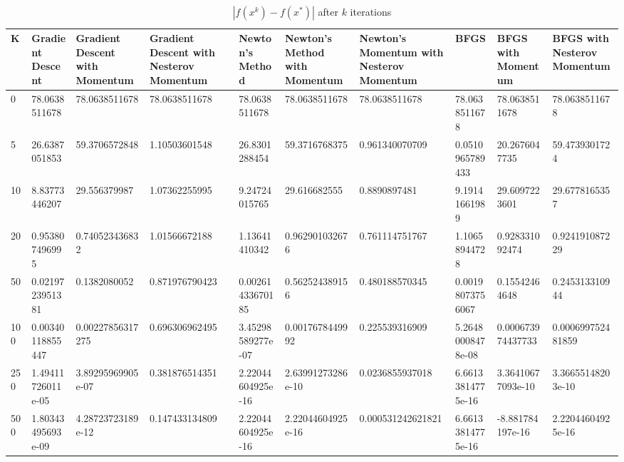 \documentclass{article}
\begin{document}
\begin{table}[H]
	\centering
	\caption{$ | f(x^k) - f(x^*) | $ after $k$ iterations}
	\label{Ryan function table}
	\begin{tabular}{|l|l|l|l|l|l|l|l|l|l|}
		\hline
		K & Gradient Descent & Gradient Descent with Momentum & Gradient Descent with Nesterov Momentum & Newton's Method & Newton's Method with Momentum & Newton's Momentum with Nesterov Momentum & BFGS & BFGS with Momentum & BFGS with Nesterov Momentum \\
		\hline
		0 & 78.0638511678 & 78.0638511678 & 78.0638511678 & 78.0638511678 & 78.0638511678 & 78.0638511678 & 78.0638511678 & 78.0638511678 & 78.0638511678 \\
		\hline
		5 & 26.6387051853 & 59.3706572848 & 1.10503601548 & 26.8301288454 & 59.3716768375 & 0.961340070709 & 0.0510965789433 & 20.2676047735 & 59.4739301724 \\
		\hline
		10 & 8.83773446207 & 29.556379987 & 1.07362255995 & 9.24724015765 & 29.616682555 & 0.8890897481 & 9.19141661989 & 29.6097223601 & 29.6778165357 \\
		\hline
		20 & 0.953807496995 & 0.740523436832 & 1.01566672188 & 1.13641410342 & 0.962901032676 & 0.761114751767 & 1.10658944728 & 0.928331092474 & 0.924191087229 \\
		\hline
		50 & 0.0219723951381 & 0.1382080052 & 0.871976790423 & 0.00261433670185 & 0.562524389156 & 0.480188570345 & 0.00198073756067 & 0.15542464648 & 0.245313310944 \\
		\hline
		100 & 0.00340118855447 & 0.00227856317275 & 0.696306962495 & 3.45298589277e-07 & 0.0017678449992 & 0.225539316909 & 5.26480008478e-08 & 0.000673974437733 & 0.000699752481859 \\
		\hline
		250 & 1.49411726011e-05 & 3.89295969905e-07 & 0.381876514351 & 2.22044604925e-16 & 2.63991273286e-10 & 0.0236855937018 & 6.66133814775e-16 & 3.36410677093e-10 & 3.36655148203e-10 \\
		\hline
		500 & 1.80343495693e-09 & 4.28723723189e-12 & 0.147433134809 & 2.22044604925e-16 & 2.22044604925e-16 & 0.000531242621821 & 6.66133814775e-16 & -8.881784197e-16 & 2.22044604925e-16 \\
		\hline
	\end{tabular}
\end{table}
\end{document}
